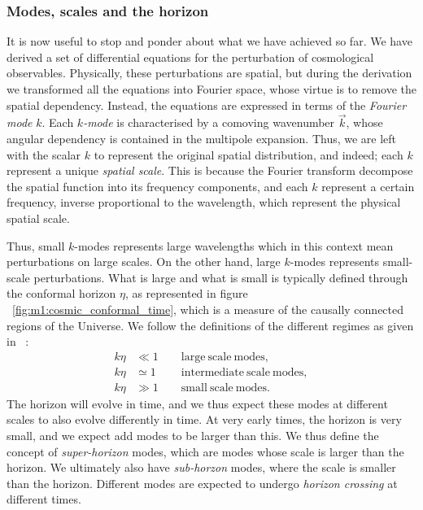 \subsubsection{Modes, scales and the horizon}\label{sec:m3:theory:modes_scales_horizon}
    It is now useful to stop and ponder about what we have achieved so far. We have derived a set of differential equations for the perturbation of cosmological observables. Physically, these perturbations are spatial, but during the derivation we transformed all the equations into Fourier space, whose virtue is to remove the spatial dependency. Instead, the equations are expressed in terms of the \textit{Fourier mode} $k$. Each $k$\textit{-mode} is characterised by a comoving wavenumber $\vec{k}$, whose angular dependency is contained in the multipole expansion. Thus, we are left with the scalar $k$ to represent the original spatial distribution, and indeed; each $k$ represent a unique \textit{spatial scale}. This is because the Fourier transform decompose the spatial function into its frequency components, and each $k$ represent a certain frequency, inverse proportional to the wavelength, which represent the physical spatial scale. 

    Thus, small $k$-modes represents large wavelengths which in this context mean perturbations on large scales. On the other hand, large $k$-modes represents small-scale perturbations. What is large and what is small is typically defined through the conformal horizon $\eta$, as represented in figure ~\cref{fig:m1:cosmic_conformal_time}, which is a measure of the causally connected regions of the Universe. We follow the definitions of the different regimes as given in ~\cite{dodelson2020modern}:
    \begin{equation}\label{eq:m3:theory:mode_scale_definition}
        \begin{split}
            k\eta &\ll 1 \quad \quad \mathrm{large\ scale\ modes,} \\
            k\eta &\simeq 1 \quad \quad \mathrm{\ intermediate\ scale\ modes,}\\
            k\eta &\gg 1 \quad \quad \mathrm{small\ scale\ modes.}
        \end{split}
    \end{equation}
    The horizon will evolve in time, and we thus expect these modes at different scales to also evolve differently in time. At very early times, the horizon is very small, and we expect add modes to be larger than this. We thus define the concept of \textit{super-horizon} modes, which are modes whose scale is larger than the horizon. We ultimately also have \textit{sub-horzon} modes, where the scale is smaller than the horizon. Different modes are expected to undergo \textit{horizon crossing} at different times. 
    

